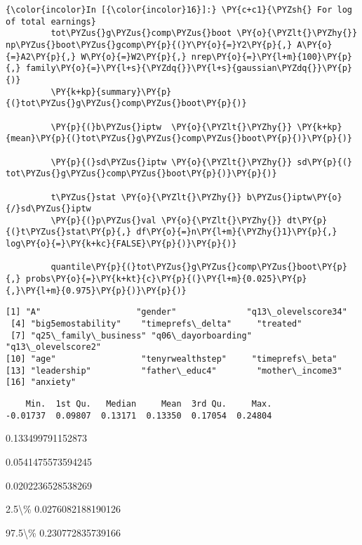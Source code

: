    \begin{Verbatim}[commandchars=\\\{\}]
{\color{incolor}In [{\color{incolor}16}]:} \PY{c+c1}{\PYZsh{} For log of total earnings}
         tot\PYZus{}g\PYZus{}comp\PYZus{}boot \PY{o}{\PYZlt{}\PYZhy{}} np\PYZus{}boot\PYZus{}gcomp\PY{p}{(}Y\PY{o}{=}Y2\PY{p}{,} A\PY{o}{=}A2\PY{p}{,} W\PY{o}{=}W2\PY{p}{,} nrep\PY{o}{=}\PY{l+m}{100}\PY{p}{,} family\PY{o}{=}\PY{l+s}{\PYZdq{}}\PY{l+s}{gaussian\PYZdq{}}\PY{p}{)} 
         \PY{k+kp}{summary}\PY{p}{(}tot\PYZus{}g\PYZus{}comp\PYZus{}boot\PY{p}{)}
         
         \PY{p}{(}b\PYZus{}iptw  \PY{o}{\PYZlt{}\PYZhy{}} \PY{k+kp}{mean}\PY{p}{(}tot\PYZus{}g\PYZus{}comp\PYZus{}boot\PY{p}{)}\PY{p}{)}
         
         \PY{p}{(}sd\PYZus{}iptw \PY{o}{\PYZlt{}\PYZhy{}} sd\PY{p}{(}  tot\PYZus{}g\PYZus{}comp\PYZus{}boot\PY{p}{)}\PY{p}{)}
         
         t\PYZus{}stat \PY{o}{\PYZlt{}\PYZhy{}} b\PYZus{}iptw\PY{o}{/}sd\PYZus{}iptw
         \PY{p}{(}p\PYZus{}val \PY{o}{\PYZlt{}\PYZhy{}} dt\PY{p}{(}t\PYZus{}stat\PY{p}{,} df\PY{o}{=}n\PY{l+m}{\PYZhy{}1}\PY{p}{,} log\PY{o}{=}\PY{k+kc}{FALSE}\PY{p}{)}\PY{p}{)}
         
         quantile\PY{p}{(}tot\PYZus{}g\PYZus{}comp\PYZus{}boot\PY{p}{,} probs\PY{o}{=}\PY{k+kt}{c}\PY{p}{(}\PY{l+m}{0.025}\PY{p}{,}\PY{l+m}{0.975}\PY{p}{)}\PY{p}{)}
\end{Verbatim}


    \begin{Verbatim}[commandchars=\\\{\}]
 [1] "A"                   "gender"              "q13\_olevelscore34"  
 [4] "big5emostability"    "timeprefs\_delta"     "treated"            
 [7] "q25\_family\_business" "q06\_dayorboarding"   "q13\_olevelscore2"   
[10] "age"                 "tenyrwealthstep"     "timeprefs\_beta"     
[13] "leadership"          "father\_educ4"        "mother\_income3"     
[16] "anxiety"            

    \end{Verbatim}

    
    \begin{verbatim}
    Min.  1st Qu.   Median     Mean  3rd Qu.     Max. 
-0.01737  0.09807  0.13171  0.13350  0.17054  0.24804 
    \end{verbatim}

    
    0.133499791152873

    
    0.0541475573594245

    
    0.0202236528538269

    
    \begin{description*}
\item[2.5\textbackslash{}\%] 0.0276082188190126
\item[97.5\textbackslash{}\%] 0.230772835739166
\end{description*}


